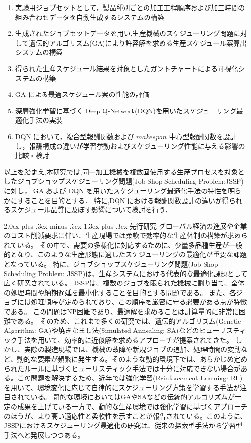 \documentclass{jarticle}
\makeatletter
\renewcommand{\section}{%
  \@startsection{section}{1}{\z@}%
  {2.0ex plus .3ex minus .3ex}%
  {1.3ex plus .3ex}%
  {\huge\bfseries}%
}
\makeatother
\begin{document}
\begin{enumerate}
\item 実験用ジョブセットとして，製品種別ごとの加工工程順序および加工時間の組み合わせデータを自動生成するシステムの構築
\item 生成されたジョブセットデータを用い,生産機械のスケジューリング問題に対して遺伝的アルゴリズム(GA)により許容解を求める生産スケジュール案算出システムの構築
\item 得られた生産スケジュール結果を対象としたガントチャートによる可視化システムの構築
\item GA による最適スケジュール案の性能の評価
\item 深層強化学習に基づく Deep Q-Network(DQN)を用いたスケジューリング最適化手法の実装
\item DQN において，複合型報酬関数および $makespan$ 中心型報酬関数を設計し，報酬構成の違いが学習挙動およびスケジューリング性能に与える影響の比較・検討
\end{enumerate}

以上を踏まえ,本研究では,同一加工機械を複数回使用する生産プロセスを対象としたジョブショップスケジューリング問題(Job Shop Scheduling Problem:JSSP)に対し，
GA および DQN を用いたスケジューリング最適化手法の特性を明らかにすることを目的とする．
特に,DQN における報酬関数設計の違いが得られるスケジュール品質に及ぼす影響について検討を行う．

\clearpage

\section{先行研究}
グローバル経済の進展や企業のコスト削減要求に伴い、生産現場では柔軟で効率的な生産体制の構築が求められている。
その中で、需要の多様化に対応するために、少量多品種生産が一般的となり、このような生産形態に適したスケジューリングの最適化が重要な課題となっている。
特に、ジョブショップスケジューリング問題(Job Shop Scheduling Problem: JSSP)は、生産システムにおける代表的な最適化課題として広く研究されている。
JSSPは、複数のジョブを限られた機械に割り当て、全体の処理時間や納期遅延を最小化することを目的とする問題である。
また、各ジョブには処理順序が定められており、この順序を厳密に守る必要がある点が特徴である。
この問題はNP困難であり、最適解を求めることは計算量的に非常に困難である。
そのため、これまで多くの研究では、遺伝的アルゴリズム(Genetic Algorithm: GA)や焼きなまし法(Simulated Annealing: SA)などのヒューリスティック手法を用いて、効率的に近似解を求めるアプローチが提案されてきた。
しかし、実際の製造現場では、機械の故障や新規ジョブの追加、処理時間の変動など、動的な要素が頻繁に発生する。そのような動的環境下では、あらかじめ定められたルールに基づくヒューリスティック手法では十分に対応できない場合がある。この問題を解決するため、近年では強化学習(Reinforcement Learning: RL)を用いて、環境変化に応じて自律的にスケジューリング方策を学習する手法が注目されている。
静的な環境においてはGAやSAなどの伝統的アルゴリズムが一定の成果を上げている一方で、動的な生産環境では強化学習に基づくアプローチのほうが、より高い適応性と柔軟性を示すことが報告されている。このように、JSSPにおけるスケジューリング最適化の研究は、従来の探索型手法から学習型手法へと発展しつつある。
\end{document}
